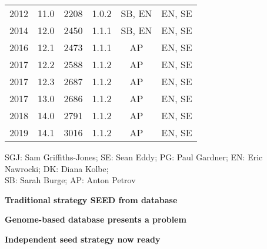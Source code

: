 \documentclass[landscape]{slides}
\begin{document}
\begin{slide}
\begin{center}
\begin{tabular}{ccrrcc}
2012 & 11.0    &     2208 &   1.0.2 & SB, EN  & EN, SE \\
2014 & 12.0    &     2450 &   1.1.1 & SB, EN  & EN, SE \\
2016 & 12.1    &     2473 &   1.1.1 & AP  & EN, SE \\
2017 & 12.2    &     2588 &   1.1.2 & AP  & EN, SE \\
2017 & 12.3    &     2687 &   1.1.2 & AP  & EN, SE \\
2017 & 13.0    &     2686 &   1.1.2 & AP  & EN, SE \\
2018 & 14.0    &     2791 &   1.1.2 & AP  & EN, SE \\
2019 & 14.1    &     3016 &   1.1.2 & AP  & EN, SE \\
\end{tabular}

\end{center}

\tiny
SGJ: Sam Griffiths-Jones; SE: Sean Eddy; PG: Paul Gardner; EN: Eric
Nawrocki; DK: Diana Kolbe; \\ SB: Sarah Burge; AP: Anton Petrov
\normalsize


\vfill
\end{slide}
\begin{slide}
\begin{center}

\textbf{Traditional strategy SEED from database} 


\vfill

\end{center}
\end{slide}
\begin{slide}
\begin{center}

\textbf{Genome-based database presents a problem}


\vfill

\end{center}
\end{slide}
\begin{slide}
\begin{center}

\textbf{Independent seed strategy now ready}


\vfill

\end{center}
\end{slide}
\end{document}
